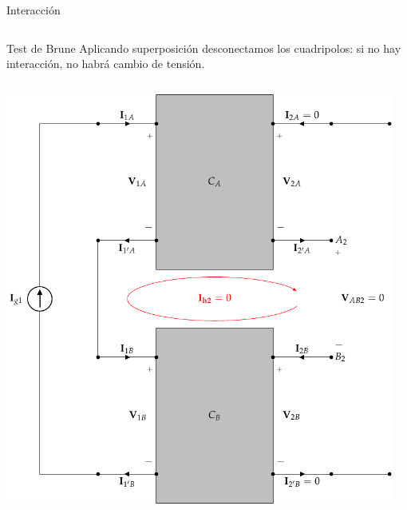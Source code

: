 \documentclass[xcolor={usenames,svgnames,dvipsnames}]{beamer}
\begin{document}
\begin{frame}[label={sec:org0818282},plain]{Interacción}
\begin{columns}
\begin{column}{0.65\columnwidth}
\begin{center}
\end{center}
\end{column}
\end{columns}
\end{frame}

\begin{frame}[label={sec:orgabb371a},plain]{Test de Brune}
Aplicando superposición desconectamos los cuadripolos: \alert{si no hay interacción, no habrá cambio de tensión}.
\begin{columns}
\begin{column}{0.65\columnwidth}
\begin{center}
\includegraphics[width=.9\linewidth]{../figs/serie-serie-brune-entrada.pdf}
\end{center}
\end{column}
\begin{column}{0.65\columnwidth}
\begin{center}

\end{center}
\end{column}
\end{columns}
\end{frame}
\end{document}
